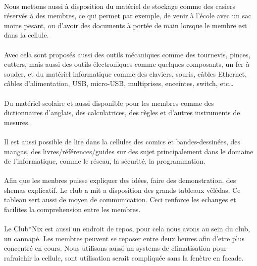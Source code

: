 \documentclass[11pt]{report}
\begin{document}
\paragraph{} Nous mettons aussi à disposition du matériel de stockage comme des
casiers réservés à des membres, ce qui permet par exemple, de venir à l'école
avec un sac moins pesant, ou d'avoir des documents à portée de main lorsque le
membre est dans la cellule.

\paragraph{} Avec cela sont proposés aussi des outils mécaniques comme des
tournevis, pinces, cutters, mais aussi des outils électroniques comme quelques
composants, un fer à souder, et du matériel informatique comme des claviers,
souris, câbles Ethernet, câbles d'alimentation, USB, micro-USB, multiprises,
enceintes, switch, etc\ldots

\paragraph{} Du matériel scolaire et aussi disponible pour les membres comme
des dictionnaires d'anglais, des calculatrices, des règles et d'autres
instruments de mesures.

\paragraph{} Il est aussi possible de lire dans la cellules des comics et
bandes-dessinées, des mangas, des livres/références/guides sur des sujet
principalement dans le domaine de l'informatique, comme le réseau, la sécurité,
la programmation.


\paragraph{} Afin que les menbres puisse expliquer des idées, faire des demonstration, des shemas explicatif. Le club a mit a disposition des grands tableaux vélédas.
Ce tableau sert aussi de moyen de communication.
Ceci renforce les echanges et facilites la comprehension entre les membres.

\paragraph{} Le Club*Nix est aussi un endroit de repos, pour cela nous avons au sein du club, un cannapé. Les membres peuvent se reposer entre deux heures afin d'etre plus concentré en cours. Nous utilisons aussi un systems de climatisation pour rafraichir la cellule, sont utilisation serait compliquée sans la fenètre en facade.
\end{document}
